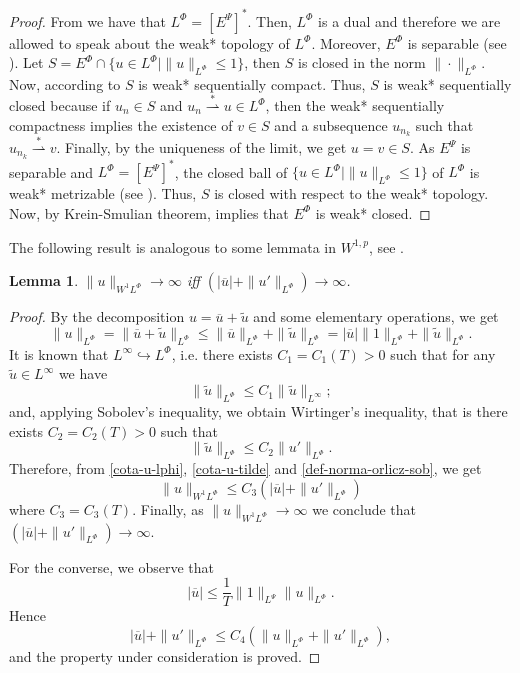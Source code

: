 \documentclass[twoside]{elsarticle}
\newtheorem{lem}[thm]{Lemma}
\theoremstyle{remark}
\newcommand{\orlnor}{\|_{L^{\Phi}}}
\newcommand{\lphi}{L^{\Phi}}
\newcommand{\lpsi}{L^{\Psi}}
\newcommand{\ephi}{E^{\Phi}}
\newcommand{\sobnor}{\|_{W^{1}\lphi}}
\renewcommand{\leq}{\leqslant}
\newcommand{\epsi}{E^{\Psi}}
\begin{document}
\begin{proof}
From \cite[Thm. 7, p. 110]{rao1991theory} we have that $\lphi=\left[\epsi\right]^*
$.
Then, $\lphi$ is a dual and therefore we are allowed to speak about the weak* topology of $\lphi$.
Moreover, $\ephi
$ is separable (see \cite[Thm. 1, p. 87]{rao1991theory}).
Let $S=\ephi\cap \{u \in \lphi|\|u\orlnor\leq 1\}$, then $S$ is closed in the norm $\|\cdot\orlnor$. 
Now, according to \cite[Cor. 5, p. 148]{rao1991theory} $S$ is weak* sequentially compact. 
Thus, $S$ is weak* sequentially closed because if $u_n\in S$ and
$u_n \overset{*}{\rightharpoonup}u \in \lphi$, then  the weak* sequentially compactness implies the existence of $v \in S$ and a subsequence $u_{n_k}$ such that
$u_{n_k}\overset{*}{\rightharpoonup}v$. Finally, by the uniqueness of   the limit, we get
$u=v\in S$.
As $\epsi$ is separable and $\lphi=\left[\epsi\right]^*$, the closed ball of $\{u \in \lphi | \|u\orlnor\leq 1\}$ of $\lphi$  is  weak* metrizable (see \cite[Thm. 5.1, p. 138]{Conway1977}).
Thus, $S$ is closed with respect to  the weak* topology. Now, by  Krein-Smulian theorem, \cite[Cor. 12.6, p. 165]{Conway1977} implies that $\ephi$ is weak* closed.
\end{proof}

The following result is analogous to some lemmata in $W^{1,p}$, see \cite[Lem. 1]{xu2007some}.
\begin{lem}\label{infinito-a-prom-upunto}
 $\|u\sobnor\to \infty$ iff  $(|\overline{u}|+\|u'\orlnor)\to \infty$.
\end{lem}

\begin{proof}
By the decomposition $u=\overline{u}+\tilde{u}$ and some elementary operations,
we get
\begin{equation}\label{cota-u-lphi}
\|u\orlnor=
\|\overline{u}+\tilde{u}\orlnor\leq
\|\overline{u}\orlnor+\|\tilde{u}\orlnor=
|\overline{u}|\|1\orlnor+\|\tilde{u}\orlnor.
\end{equation}
It is known that $L^{\infty}\hookrightarrow\lphi$, i.e.
there exists $C_1=C_1(T)>0$ such that for any $\tilde{u}\in L^{\infty}$ we have
\[
\|\tilde{u}\orlnor
\leq
C_1 \|\tilde{u}\|_{L^{\infty}};
\]
and, applying  Sobolev's inequality,  we obtain Wirtinger's inequality, 
that is there exists $C_2=C_2(T)>0$ such that
\begin{equation}\label{cota-u-tilde}
\|\tilde{u}\orlnor
\leq
C_2\|u'\orlnor.
\end{equation}
Therefore, from \eqref{cota-u-lphi}, \eqref{cota-u-tilde} and \eqref{def-norma-orlicz-sob},
we get
\[
\|u\sobnor\leq
C_3(|\overline{u}|+\|u'\orlnor)
\]
where $C_3=C_3(T)$. Finally, as $\|u\sobnor\to \infty$ we conclude that
$(|\overline{u}|+\|u'\orlnor)\to \infty$.

For the converse, we observe that
\[|\overline{u}|\leq \frac{1}{T}\|1\|_{\lpsi}\|u\orlnor.\]
Hence
\[|\overline{u}| +\|u'\orlnor\leq C_4(\|u\orlnor +\|u'\orlnor),\]
and the property under consideration is proved.
\end{proof}
\end{document}
